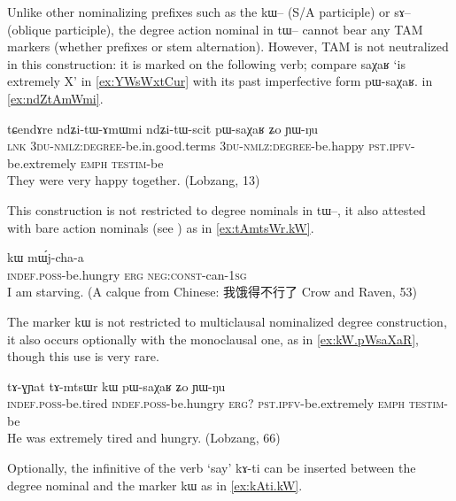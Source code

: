 \documentclass[oldfontcommands,oneside,a4paper,11pt]{article}
\newcommand{\ipa}[1]{{\phon #1}} %
\newcommand{\zh}[1]{{\cn #1}}
\begin{document}
Unlike other nominalizing prefixes such as the \ipa{kɯ--} (S/A participle) or \ipa{sɤ--} (oblique participle), the degree action nominal in \ipa{tɯ--} cannot bear any TAM markers (whether prefixes or stem alternation). However, TAM is not neutralized in this construction: it is marked on the following verb; compare \ipa{saχaʁ} `is extremely X' in \ref{ex:YWsWxtCur} with its past imperfective form \ipa{pɯ-saχaʁ}.
in \ref{ex:ndZtAmWmi}.

 \begin{exe}
\ex \label{ex:ndZtAmWmi}
\gll 
 \ipa{tɕendɤre}  	\ipa{ndʑi-tɯ-ɤmɯmi}  	\ipa{ndʑi-tɯ-scit}  	\ipa{pɯ-saχaʁ}  	\ipa{ʑo}  	\ipa{ɲɯ-ŋu}  \\
 \textsc{lnk} \textsc{3du-nmlz:degree}-be.in.good.terms \textsc{3du-nmlz:degree}-be.happy \textsc{pst.ipfv}-be.extremely \textsc{emph} \textsc{testim}-be \\
 \glt They were very happy together. (Lobzang, 13)
\end{exe}

This construction is not restricted to degree nominals in \ipa{tɯ--}, it also attested with bare action nominals (see \citealt[7-9]{jacques14antipassive}) as in \ref{ex:tAmtsWr.kW}.
    \begin{exe}
  \ex  \label{ex:tAmtsWr.kW}  
  \gll \ipa{tɤ-mtsɯr}  	\ipa{kɯ}  	\ipa{mɯ́j-cha-a}  \\
  \textsc{indef.poss}-be.hungry \textsc{erg} \textsc{neg:const}-can-\textsc{1sg} \\
\glt I am starving.  (A calque from Chinese: \zh{我饿得不行了} Crow and Raven, 53) 
   \end{exe} 
  
 The marker \ipa{kɯ} is not restricted to multiclausal nominalized degree construction, it also occurs optionally with the monoclausal one, as in \ref{ex:kW.pWsaXaR}, though this use is very rare.
 
      \begin{exe}
  \ex  \label{ex:kW.pWsaXaR}  
  \gll 
   \ipa{tɤ-ɣɲat}  	\ipa{tɤ-mtsɯr}  	\ipa{kɯ}  	\ipa{pɯ-saχaʁ}  	\ipa{ʑo}  	\ipa{ɲɯ-ŋu}  \\
      \textsc{indef.poss}-be.tired     \textsc{indef.poss}-be.hungry \textsc{erg?} \textsc{pst.ipfv}-be.extremely \textsc{emph} \textsc{testim}-be \\
      \glt He was extremely tired and hungry. (Lobzang, 66)
   \end{exe} 

Optionally, the infinitive of the verb `say' \ipa{kɤ-ti} can be inserted between the degree nominal and the marker \ipa{kɯ} as in \ref{ex:kAti.kW}.
\end{document}
